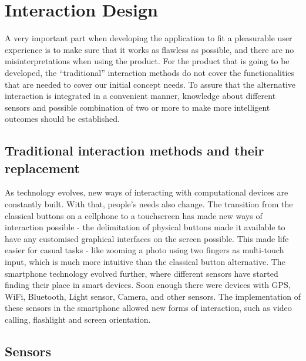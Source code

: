 \section{Interaction Design}
A very important part when developing the application to fit a pleasurable user experience is to make sure that it works as flawless as possible, and there are no misinterpretations when using the product. For the product that is going to be developed, the “traditional” interaction methods do not cover the functionalities that are needed to cover our initial concept needs. To assure that the alternative interaction is integrated in a convenient manner, knowledge about different sensors and possible combination of two or more to make more intelligent outcomes should be established.
\subsection{Traditional interaction methods and their replacement}
As technology evolves, new ways of interacting with computational devices are constantly built. With that, people’s needs also change. The transition from the classical buttons on a cellphone to a touchscreen has made new ways of interaction possible - the delimitation of physical buttons made it available to have any customised graphical interfaces on the screen possible. This made life easier for casual tasks - like zooming a photo using two fingers as multi-touch input, which is much more intuitive than the classical button alternative.
The smartphone technology evolved further, where different sensors have started finding their place in smart devices. Soon enough there were devices with GPS, WiFi, Bluetooth, Light sensor, Camera, and other sensors. The implementation of these sensors in the smartphone allowed new forms of interaction, such as video calling, flashlight and screen orientation.
\subsection{Sensors}

